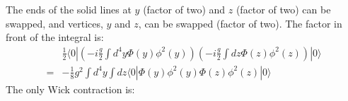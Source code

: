 \documentclass[12pt,a4]{article}
\begin{document}
\begin{enumerate}
\begin{enumerate}
\begin{center}
{ %
        }
          \end{center}

          The ends of the solid lines at $y$ (factor of two) and $z$ (factor of two) can be swapped, and vertices, $y$ and $z$, can be swapped (factor of two).
          The factor in front of the integral is:
          \begin{align*}
            & \frac{1}{2} \langle 0|\left(-i\frac{g}{2}\int d^4y \Phi(y)\phi^2(y)\right)\left(-i\frac{g}{2}\int dz \Phi(z)\phi^2(z)\right)|0\rangle \\
            = &- \frac{1}{8} g^2 \int d^4y \int dz\langle 0|\Phi(y)\phi^2(y) \Phi(z)\phi^2(z)|0\rangle
          \end{align*}
          The only Wick contraction is:\\


\end{enumerate}
\end{enumerate}
\end{document}
